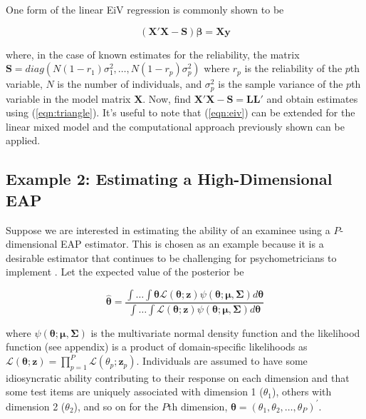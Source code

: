 \documentclass[12pt]{article}
\begin{document}
One form of the linear EiV regression is commonly shown to be \cite{stata:eiv}

\begin{equation}
\label{eqn:eiv}
(\bm{X}'\bm{X} - \bm{S})\bm{\beta} = \bm{X}\bm{y} 
\end{equation}

\noindent where, in the case of known estimates for the reliability, the matrix $\bm{S} = diag(N(1-r_1)\sigma^2_1, \ldots, N(1-r_p)\sigma^2_p) $ where $r_p$ is the reliability of the $p$th variable, $N$ is the number of individuals, and $\sigma^2_p$ is the sample variance of the $p$th variable in the model matrix $\bm{X}$.  Now, find $\bm{X}'\bm{X} - \bm{S} = \bm{L}\bm{L}'$ and obtain estimates using (\ref{eqn:triangle}). It's useful to note that (\ref{eqn:eiv}) can be extended for the linear mixed model and the computational approach previously shown can be applied. 

\subsection*{Example 2: Estimating a High-Dimensional EAP}

Suppose we are interested in estimating the ability of an examinee using a $P$-dimensional EAP estimator. This is chosen as an example because it is a desirable estimator that continues to be challenging for psychometricians to implement \cite{Chalmers,ferrando}. Let the expected value of the posterior be 

\begin{equation}
\label{eqn:scoreIntegral}
\widehat{\boldsymbol{\theta}} = \frac{\int \dots \int \boldsymbol{\theta} \mathcal{L}(\boldsymbol{\theta};\boldsymbol{z}) \psi(\boldsymbol{\theta};\boldsymbol{\mu},\boldsymbol{\Sigma})d\boldsymbol{\theta}}{\int \dots \int \mathcal{L}(\boldsymbol{\theta};\boldsymbol{z})\psi(\boldsymbol{\theta};\boldsymbol{\mu},\boldsymbol{\Sigma})d\boldsymbol{\theta}}
\end{equation}

\noindent where $\psi(\boldsymbol{\theta};\boldsymbol{\mu},\boldsymbol{\Sigma})$ is the multivariate normal density function and the likelihood function (see appendix) is a product of domain-specific likelihoods as $\mathcal{L}(\boldsymbol{\theta};\boldsymbol{z}) = \prod^P_{p=1}\mathcal{L}(\theta_p;\bm{z}_p)$. Individuals are assumed to have some idiosyncratic ability contributing to their response on each dimension and that some test items are uniquely associated with dimension 1 ($\theta_1$), others with dimension 2 ($\theta_2$), and so on for the $P$th dimension, $\boldsymbol{\theta}\boldsymbol{=}(\theta_1, \theta_2,\dots ,\theta_P)^{'}$. 
\end{document}

